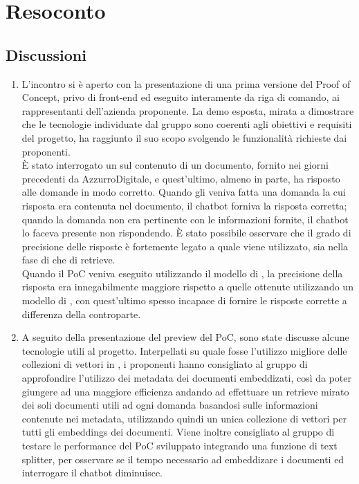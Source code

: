 \section{Resoconto} \label{sec:resoconto}
\subsection{Discussioni} \label{subsec:resdiscussione}
\begin{enumerate}
    \item L'incontro si è aperto con la presentazione di una prima versione del Proof of Concept, privo di front-end ed eseguito interamente da riga di comando, ai rappresentanti dell'azienda proponente. La demo esposta, mirata a dimostrare che le tecnologie individuate dal gruppo sono coerenti agli obiettivi e requisiti del progetto, ha raggiunto il suo scopo svolgendo le funzionalità richieste dai proponenti.\\È stato interrogato un  sul contenuto di un documento, fornito nei giorni precedenti da AzzurroDigitale, e quest'ultimo, almeno in parte, ha risposto alle domande in modo corretto. Quando gli veniva fatta una domanda la cui risposta era contenuta nel documento, il chatbot forniva la risposta corretta; quando la domanda non era pertinente con le informazioni fornite, il chatbot lo faceva presente non rispondendo. È stato  possibile osservare che il grado di precisione delle risposte è fortemente legato a quale  viene utilizzato, sia nella fase di  che di retrieve.\\Quando il PoC veniva eseguito utilizzando il modello di , la precisione della risposta era innegabilmente maggiore rispetto a quelle ottenute utilizzando un modello  di , con quest'ultimo spesso incapace di fornire le risposte corrette a differenza della controparte.
    \item A seguito della presentazione del preview del PoC, sono state discusse alcune tecnologie utili al progetto. Interpellati su quale fosse l'utilizzo migliore delle collezioni di vettori in , i proponenti hanno consigliato al gruppo di approfondire l'utilizzo dei metadata dei documenti embeddizati, così da poter giungere ad una maggiore efficienza andando ad effettuare un retrieve mirato dei soli documenti utili ad ogni domanda basandosi sulle informazioni contenute nei metadata, utilizzando quindi un unica collezione di vettori per tutti gli embeddings dei documenti. Viene inoltre consigliato al gruppo di testare le performance del PoC sviluppato integrando una funzione di text splitter, per osservare se il tempo necessario ad embeddizare i documenti ed interrogare il chatbot diminuisce.\\

\end{enumerate}
